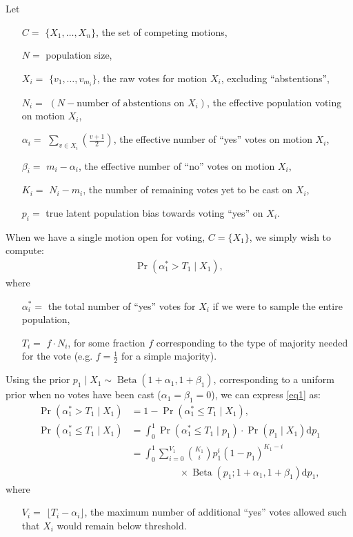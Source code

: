 \documentclass{sigchi}
\begin{document}
Let
\begin{description}
\begin{itemize}
\item[$C = $] $\{X_1,\ldots, X_n\}$, the set of competing motions,
\item[$N = $] population size,
\item[$X_i = $] $\{v_1, \ldots, v_{m_i}\}$, the raw votes for motion $X_i$, excluding ``abstentions'',
\item[$N_i = $] $(N - \textrm{number of abstentions on } X_i)$, the effective population voting on motion $X_i$,
\item[$\alpha_i = $] $\sum\limits_{v \in X_i} \left(\frac{v+1}{2}\right)$, the effective number of ``yes'' votes on motion $X_i$,
\item[$\beta_i = $] $m_i - \alpha_i$, the effective number of ``no'' votes on motion $X_i$,
\item[$K_i = $] $N_i - m_i$, the number of remaining votes yet to be cast on $X_i$,
\item[$p_i = $] true latent population bias towards voting ``yes'' on $X_i$.
\end{itemize}
\end{description}

When we have a single motion open for voting, $C=\{X_1\}$, we simply wish to compute:
\begin{align}\label{eq1}
\Pr(\alpha^*_1 > T_1 \mid X_1),
\end{align}
where
\begin{description}
\begin{itemize}
\item[$\alpha^*_i = $] the total number of ``yes'' votes for $X_i$ if we were to sample the entire population,
\item[$T_i = $] $f \cdot N_i$, for some fraction $f$ corresponding to the type of majority needed for the vote
(e.g. $f=\frac{1}{2}$ for a simple majority).
\end{itemize}
\end{description}
Using the prior $p_1 \mid X_1 \sim \operatorname{Beta}(1+\alpha_1,1+\beta_1)$, corresponding to a uniform prior when
no votes have been cast ($\alpha_1 = \beta_1 = 0$), we can express \eqref{eq1} as:
\begin{align*}
\Pr(\alpha^*_1 > T_1 \mid X_1) &= 1 - \Pr(\alpha^*_1 \leq T_1 \mid X_1),\\
\Pr(\alpha^*_1 \leq T_1 \mid X_1) &= \int_0^1 \Pr(\alpha^*_1 \leq T_1 \mid p_1)\cdot \Pr(p_1 \mid X_1) \mathrm{d}p_1\\
&= \int_0^1 \sum\limits_{i=0}^{V_1} {K_1 \choose i} p_1^{i} {(1-p_1)}^{K_1-i} \\
& \qquad\qquad\quad \times \operatorname{Beta}(p_1; 1+\alpha_1,1+\beta_1) \mathrm{d}p_1,
\end{align*}
where
\begin{description}
\begin{itemize}
\item[$V_i = $] $\lfloor{T_i - \alpha_i}\rfloor$, the maximum number of additional ``yes'' votes allowed such that
$X_i$ would remain below threshold.
\end{itemize}
\end{description}
\end{document}

